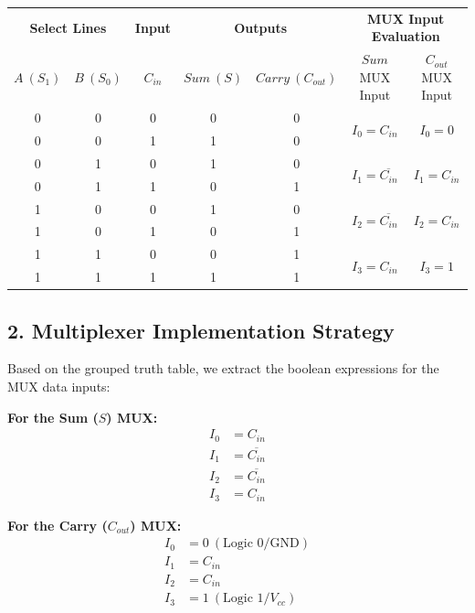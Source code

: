 \documentclass[12pt,a3paper]{article}
\begin{document}
\begin{enumerate}
\begin{tcolorbox}[enhanced,breakable,ansbox,colback=cD!4,colframe=cD,boxrule=0.8pt,arc=5pt,title={\textbf{Answer}},fonttitle=\bfseries\color{white},colbacktitle=cD]
\begin{center}
\renewcommand{\arraystretch}{1.2}
\begin{tabular}{cc | c || c | c || c | c}
\toprule
\multicolumn{2}{c|}{\textbf{Select Lines}} & \textbf{Input} & \multicolumn{2}{c||}{\textbf{Outputs}} & \multicolumn{2}{c}{\textbf{MUX Input Evaluation}} \\
$A \ (S_1)$ & $B \ (S_0)$ & $C_{in}$ & $Sum \ (S)$ & $Carry \ (C_{out})$ & $Sum$ MUX Input & $C_{out}$ MUX Input \\
\midrule
0 & 0 & 0 & 0 & 0 & \multirow{2}{*}{$I_0 = C_{in}$} & \multirow{2}{*}{$I_0 = 0$} \\
0 & 0 & 1 & 1 & 0 & & \\
\midrule
0 & 1 & 0 & 1 & 0 & \multirow{2}{*}{$I_1 = \overline{C_{in}}$} & \multirow{2}{*}{$I_1 = C_{in}$} \\
0 & 1 & 1 & 0 & 1 & & \\
\midrule
1 & 0 & 0 & 1 & 0 & \multirow{2}{*}{$I_2 = \overline{C_{in}}$} & \multirow{2}{*}{$I_2 = C_{in}$} \\
1 & 0 & 1 & 0 & 1 & & \\
\midrule
1 & 1 & 0 & 0 & 1 & \multirow{2}{*}{$I_3 = C_{in}$} & \multirow{2}{*}{$I_3 = 1$} \\
1 & 1 & 1 & 1 & 1 & & \\
\bottomrule
\end{tabular}
\end{center}

\vspace{0.2cm}
\subsection*{2. Multiplexer Implementation Strategy}
Based on the grouped truth table, we extract the boolean expressions for the MUX data inputs:

\textbf{For the Sum ($S$) MUX:}
\begin{align*}
    I_0 &= C_{in} \\
    I_1 &= \overline{C_{in}} \\
    I_2 &= \overline{C_{in}} \\
    I_3 &= C_{in}
\end{align*}

\textbf{For the Carry ($C_{out}$) MUX:}
\begin{align*}
    I_0 &= 0 \ (\text{Logic } 0 / \text{GND}) \\
    I_1 &= C_{in} \\
    I_2 &= C_{in} \\
    I_3 &= 1 \ (\text{Logic } 1 / V_{cc})
\end{align*}


\end{tcolorbox}
\end{enumerate}
\end{document}
